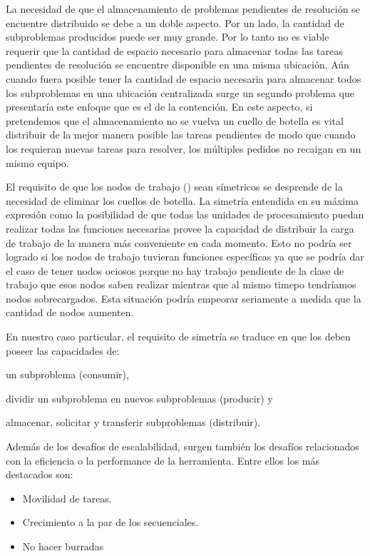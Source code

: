 La necesidad de que el almacenamiento de problemas pendientes de resolución se
encuentre distribuido se debe a un doble aspecto. Por un lado, la cantidad de
subproblemas producidos puede ser muy grande. Por lo tanto no es viable
requerir que la cantidad de espacio necesario para almacenar todas las tareas
pendientes de resolución se encuentre disponible en una misma ubicación. Aún
cuando fuera posible tener la cantidad de espacio necesaria para almacenar
todos los subproblemas en una ubicación centralizada surge un segundo problema
que presentaría este enfoque que es el de la contención. En este aspecto, si
pretendemos que el almacenamiento no se vuelva un cuello de botella es vital
distribuir de la mejor manera posible las tareas pendientes de modo que cuando
los \ws requieran nuevas tareas para resolver, los múltiples pedidos no
recaigan en un mismo equipo.

El requisito de que los nodos de trabajo (\ws) sean símetricos se desprende de
la necesidad de eliminar los cuellos de botella. La simetría entendida en su
máxima expresión como la posibilidad de que todas las unidades de
procesamiento puedan realizar todas las funciones necesarias provee la
capacidad de distribuir la carga de trabajo de la manera más conveniente en
cada momento. Esto no podría ser logrado si los nodos de trabajo tuvieran
funciones específicas ya que se podría dar el caso de tener nodos ociosos
porque no hay trabajo pendiente de la clase de trabajo que esos nodos saben
realizar mientras que al mismo timepo tendríamos nodos sobrecargados. Esta
situación podría empeorar seriamente a medida que la cantidad de nodos
aumenten.

En nuestro caso particular, el requisito de simetría se traduce en que los \ws
deben poseer las capacidades de: \begin{inparaenum}[a)] \item \solvear
{} un subproblema (consumir), \item
dividir un subproblema en nuevos subproblemas (producir) y \item almacenar,
solicitar y transferir subproblemas (distribuir). \end{inparaenum}

Además de los desafíos de escalabilidad, surgen también los desafíos
relacionados con la eficiencia o la performance de la herramienta. Entre ellos
los más destacados son:

\begin{itemize}
	\item Movilidad de tareas.
	\item Crecimiento a la par de los \ssolvers secuenciales.
	\item No hacer burradas 
\end{itemize}

